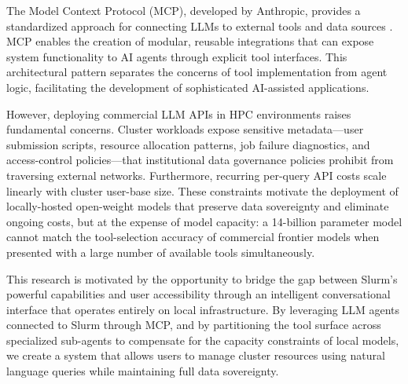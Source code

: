 The Model Context Protocol (MCP), developed by Anthropic, provides a standardized approach for connecting LLMs to external tools and data sources \cite{anthropic2024mcp, mcpspec2024}. MCP enables the creation of modular, reusable integrations that can expose system functionality to AI agents through explicit tool interfaces. This architectural pattern separates the concerns of tool implementation from agent logic, facilitating the development of sophisticated AI-assisted applications.

However, deploying commercial LLM APIs in HPC environments raises fundamental concerns. Cluster workloads expose sensitive metadata---user submission scripts, resource allocation patterns, job failure diagnostics, and access-control policies---that institutional data governance policies prohibit from traversing external networks. Furthermore, recurring per-query API costs scale linearly with cluster user-base size. These constraints motivate the deployment of locally-hosted open-weight models that preserve data sovereignty and eliminate ongoing costs, but at the expense of model capacity: a 14-billion parameter model cannot match the tool-selection accuracy of commercial frontier models when presented with a large number of available tools simultaneously.

This research is motivated by the opportunity to bridge the gap between Slurm's powerful capabilities and user accessibility through an intelligent conversational interface that operates entirely on local infrastructure. By leveraging LLM agents connected to Slurm through MCP, and by partitioning the tool surface across specialized sub-agents to compensate for the capacity constraints of local models, we create a system that allows users to manage cluster resources using natural language queries while maintaining full data sovereignty.


